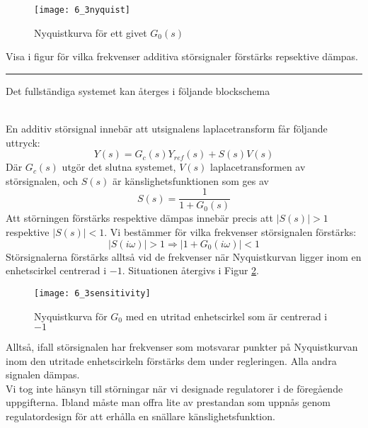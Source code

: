 \documentclass[12pt]{article}
\newcommand{\qline}{\hrule \vspace*{10pt}}
\begin{document}
\begin{figure}[h!]
  \centering
  \texttt{[image: 6\_3nyquist]}
  \caption{Nyquistkurva för ett givet $G_0(s)$}
  \label{fig:6_3nyquist}
\end{figure}
\FloatBarrier

Visa i figur för vilka frekvenser additiva störsignaler förstärks repsektive dämpas.
\qline
Det fullständiga systemet kan återges i följande blockschema \\

 \\

En additiv störsignal innebär att utsignalens laplacetransform får följande uttryck: 
\[Y(s) = G_c(s)Y_{ref}(s) + S(s)V(s)\]
Där $G_c(s)$ utgör det slutna systemet, $V(s)$ laplacetransformen av störsignalen, och $S(s)$ är känslighetsfunktionen som ges av
\[S(s) = \frac{1}{1 + G_0(s)}\]
Att störningen förstärks respektive dämpas innebär precis att $|S(s)| > 1$ respektive $|S(s)| < 1$. Vi bestämmer för vilka frekvenser störsignalen förstärks: 
\[|S(i\omega)| > 1 \Rightarrow |1 + G_0(i\omega)| < 1\]
Störsignalerna förstärks alltså vid de frekvenser när Nyquistkurvan ligger inom en enhetscirkel centrerad i $-1$. Situationen återgivs i Figur \ref{fig:6_3sensitivity}.

\begin{figure}[h!]
  \centering
  \texttt{[image: 6\_3sensitivity]}
  \caption{Nyquistkurva för $G_0$ med en utritad enhetscirkel som är centrerad i $-1$}
  \label{fig:6_3sensitivity}
\end{figure}
\FloatBarrier

Alltså, ifall störsignalen har frekvenser som motsvarar punkter på Nyquistkurvan inom den utritade enhetscirkeln förstärks dem under regleringen. Alla andra signalen dämpas.\\

Vi tog inte hänsyn till störningar när vi designade regulatorer i de föregående uppgifterna. Ibland måste man offra lite av prestandan som uppnås genom regulatordesign för att erhålla en snällare känslighetsfunktion.
\end{document}
